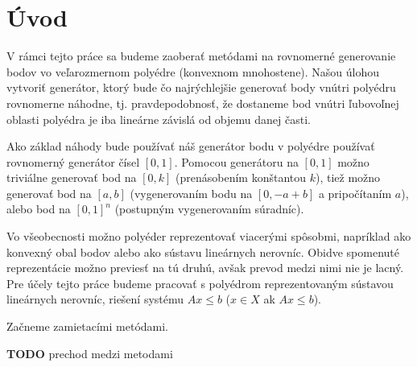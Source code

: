 \chapter*{Úvod} %

V rámci tejto práce sa budeme zaoberať metódami na rovnomerné generovanie bodov vo veľarozmernom polyédre (konvexnom mnohostene). Našou úlohou vytvoriť generátor, ktorý bude čo najrýchlejšie generovať body vnútri polyédru rovnomerne náhodne, tj. pravdepodobnosť, že dostaneme bod vnútri ľubovoľnej oblasti polyédra je iba lineárne závislá od objemu danej časti.

Ako základ náhody bude používať náš generátor bodu v polyédre používať rovnomerný generátor čísel $[0,1]$. Pomocou generátoru na $[0,1]$ možno triviálne generovať bod na $[0,k]$ (prenásobením konštantou $k$), tiež možno generovať bod na $[a,b]$ (vygenerovaním bodu na $[0, -a+b]$ a pripočítaním $a$), alebo bod na $[0,1]^n$ (postupným vygenerovaním súradníc).

Vo všeobecnosti možno polyéder reprezentovať viacerými spôsobmi, napríklad ako konvexný obal bodov alebo ako sústavu lineárnych nerovníc. Obidve spomenuté reprezentácie možno previesť na tú druhú, avšak prevod medzi nimi nie je lacný. Pre účely tejto práce budeme pracovať s polyédrom reprezentovaným sústavou lineárnych nerovníc, riešení systému $Ax \leq b$ ($x \in X$ ak $Ax \leq b$).


Začneme zamietacími metódami.

\textbf{TODO} prechod medzi metodami